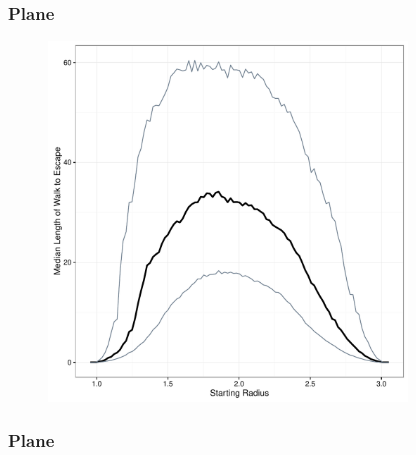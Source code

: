 \documentclass{beamer}
\begin{document}
\begin{frame}

	\frametitle{Plane}
	
	\begin{figure}
		\includegraphics[width=0.85\textwidth]{images/PlaneIn1Out3.pdf}
	\end{figure}

\end{frame}



\begin{frame}
	
	\frametitle{Plane}
	
	\begin{figure}
		
	\end{figure}
	
\end{frame}
\end{document}
